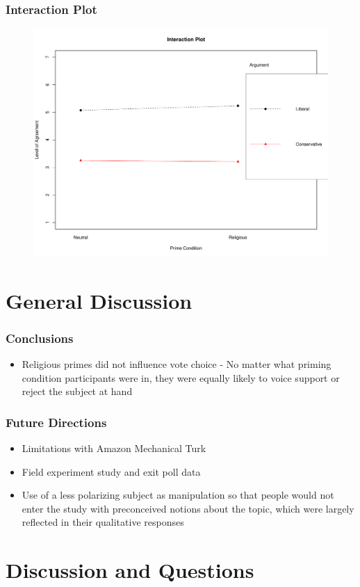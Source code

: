 \documentclass[14pt]{beamer}
\begin{document}
\begin{frame}
\frametitle{Interaction Plot}
\begin{figure}
	\centering
	{\includegraphics[width=.8\textwidth]{InteractionPlot}}
\end{figure}
\end{frame}

\section{General Discussion}

\begin{frame}
\frametitle{Conclusions}
\begin{itemize}
	\item Religious primes did not influence vote choice - No matter what priming condition participants were in, they were equally likely to voice support or reject the subject at hand
\end{itemize}
\end{frame}

\begin{frame}
\frametitle{Future Directions}
\begin{itemize}
	\item Limitations with Amazon Mechanical Turk 
	\item Field experiment study and exit poll data
	\item Use of a less polarizing subject as manipulation so that people would not enter the study with preconceived notions about the topic, which were largely reflected in their qualitative responses
\end{itemize}
\end{frame}

\section{Discussion and Questions}
\end{document}
